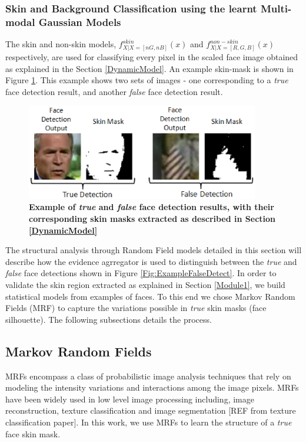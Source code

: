 \documentclass[times, 10pt,twocolumn]{article}
\begin{document}
\subsubsection{Skin and Background Classification using the learnt
Multi-modal Gaussian Models}\label{SkinnBackground} The skin and
non-skin models, $f^{skin}_{X|X=[nG,nB]}(x)$ and
$f^{non-skin}_{X|X=[R,G,B]}(x)$ respectively, are used for
classifying every pixel in the scaled face image obtained as
explained in the Section \ref{DynamicModel}. An example skin-mask
is shown in Figure \ref{Fig:Skinmasks}. This example shows two sets
of images - one corresponding to a {\it true} face detection result, and
another {\it false} face detection result. \vspace{-0.15in}
\begin{figure}[h]
\hspace{-0.4in}
\includegraphics[width=4in]{Figure6.eps}
\caption{{\bf {\selectfont Example of {\em true} and
{\em false} face detection results, with their corresponding skin
masks extracted as described in Section \ref{DynamicModel}}}}
\label{Fig:Skinmasks}
\end{figure}


\label{Module2} The structural analysis
through Random Field models detailed in this section
will describe how the evidence agrregator
is used to distinguish between the {\it true} and {\it false} face detections shown
in Figure \ref{Fig:ExampleFalseDetect}. In order to validate the skin
region extracted as explained in Section \ref{Module1}, we build
statistical models from examples of faces. To this end we
chose Markov Random Fields (MRF) to capture the variations possible
in {\it true} skin masks (face silhouette). The following
subsections details the process.

\subsection{Markov Random Fields}\label{MRF}
MRFs encompass a class of probabilistic image analysis techniques
that rely on modeling the intensity variations and interactions
among the image pixels. MRFs have been widely used in low level
image processing including, image reconstruction, texture
classification and image segmentation [REF from texture
classification paper]. In this work, we use MRFs to learn the
structure of a {\it true} face skin mask.
\end{document}
